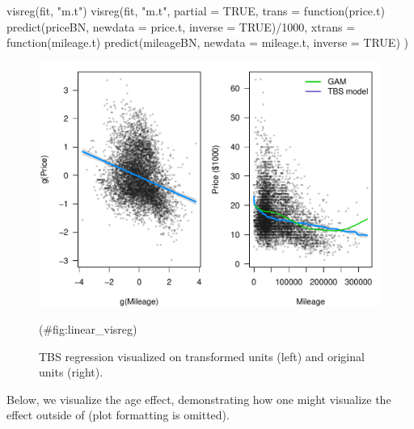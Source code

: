 \begin{Schunk}
\begin{Sinput}
visreg(fit, "m.t")
visreg(fit, "m.t", 
       partial = TRUE,
       trans = function(price.t) 
         predict(priceBN, newdata = price.t, inverse = TRUE)/1000, 
       xtrans = function(mileage.t) 
         predict(mileageBN, newdata = mileage.t, inverse = TRUE)
       )
\end{Sinput}
\end{Schunk}

\begin{Schunk}
\begin{figure}

{\centering \includegraphics[width=0.8\linewidth]{figs/linear_visreg-1} 

}

\caption[TBS regression visualized on transformed units (left) and original units (right)]{TBS regression visualized on transformed units (left) and original units (right).}(\#fig:linear_visreg)
\end{figure}
\end{Schunk}

Below, we visualize the age effect, demonstrating how one might
visualize the effect outside of  (plot formatting is
omitted).

\begin{Schunk}
\end{Schunk}

